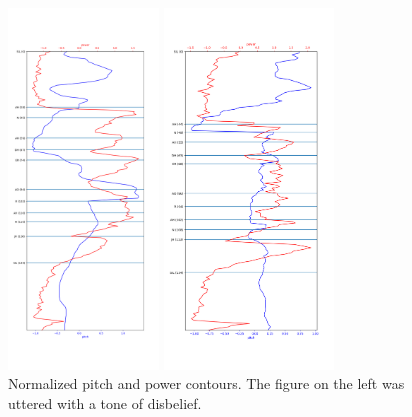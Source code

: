 \documentclass{article}
\begin{document}
\begin{figure}[htb]

\begin{minipage}[b]{.46\linewidth}
  \centering
  \centerline{\includegraphics[width=4.0cm]{orange_aNOTHer}}
\end{minipage}
\hfill
\begin{minipage}[b]{0.5\linewidth}
  \centering
  \centerline{\includegraphics[width=4.5cm]{orange_neutral}}
\end{minipage}
%
\caption{Normalized pitch and power contours. The figure on the left was uttered with a tone of disbelief.}
\label{fig:pitchpow1}
%
\end{figure}
\end{document}
